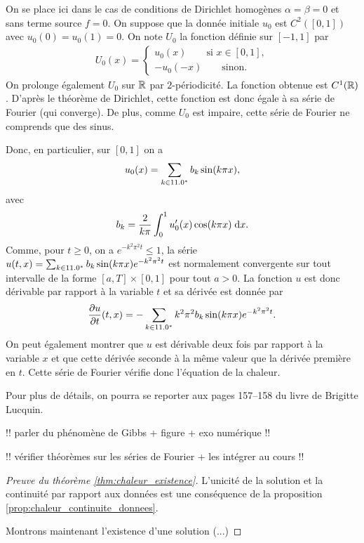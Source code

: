\documentclass[12pt,a4paper,twoside]{article}
\begin{document}
On se place ici dans le cas de conditions de Dirichlet homog\`enes
$\alpha = \beta = 0$ et sans terme source $f=0$.
On suppose que la donn\'ee initiale $u_0$ est $C^2([0,1])$ avec $u_0(0) = u_0(1) = 0$.
On note $U_0$ la fonction d\'efinie sur $[-1,1]$ par
\begin{align*}
  U_0(x) =
  \begin{cases}
    u_0(x) \qquad \text{si } x \in [0,1] ,
    \\
    -u_0(-x) \qquad \text{sinon} .
  \end{cases}
\end{align*}
On prolonge \'egalement $U_0$ sur $\mathbb{R}$ par $2$-p\'eriodicit\'e.
La fonction obtenue est $C^1(\mathbb{R})$.
D'apr\`es le th\'eor\`eme de Dirichlet, cette fonction est donc \'egale \`a 
sa s\'erie de Fourier (qui converge).
De plus, comme $U_0$ est impaire, cette s\'erie de Fourier ne comprends que 
des sinus.

Donc, en particulier, sur $[0,1]$ on a 
\begin{align*}
  u_0(x) = \sum_{k \in 11.0^*} b_k \sin(k \pi x) ,
\end{align*}
avec
\begin{align*}
  b_k = \dfrac{2}{k \pi} \int_{0}^1 u_0'(x) \cos(k \pi x) \;\mathrm{d} x .
\end{align*}
Comme, pour $t \geq 0$, on a $e^{-k^2 \pi^2 t} \leq 1$, la s\'erie 
$u(t,x) = \sum_{k\in11.0^*} b_k \sin(k \pi x) e^{- k^2 \pi^2 t}$ est normalement
convergente sur tout intervalle de la forme
$[a,T] \times [0,1]$ pour tout $a > 0$.
La fonction $u$ est donc d\'erivable par rapport \`a la variable $t$
et sa d\'eriv\'ee est donn\'ee par
\begin{align*}
  \dfrac{\partial u}{\partial t} (t,x) 
  = - \sum_{k \in 11.0^*} k^2 \pi^2 b_k \sin(k \pi x) e^{-k^2 \pi^2 t} .
\end{align*}
On peut \'egalement montrer que $u$ est d\'erivable deux fois par rapport
\`a la variable $x$ et que cette d\'eriv\'ee seconde \`a la m\^eme
valeur que la d\'eriv\'ee premi\`ere en $t$.
Cette s\'erie de Fourier v\'erifie donc l'\'equation de la chaleur.

Pour plus de d\'etails, on pourra se reporter aux pages 157--158
du livre de Brigitte Lucquin.

!! parler du ph\'enom\`ene de Gibbs + figure + exo num\'erique !!

!! v\'erifier th\'eor\`emes sur les s\'eries de Fourier
+ les int\'egrer au cours !!


\begin{proof}[Preuve du th\'eor\`eme \ref{thm:chaleur_existence}]
  L'unicit\'e de la solution et la continuit\'e par rapport aux donn\'ees est une cons\'equence
  de la proposition \ref{prop:chaleur_continuite_donnees}.

  Montrons maintenant l'existence d'une solution (...)
\end{proof}
\end{document}
